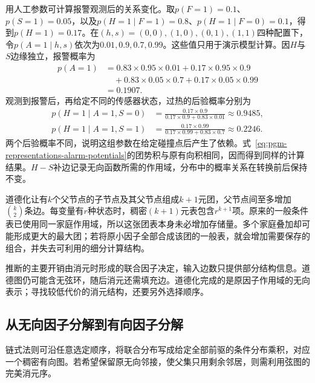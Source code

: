 用人工参数可计算报警观测后的关系变化。取$p(F=1)=0.1$、$p(S=1)=0.05$，以及$p(H=1\mid F=1)=0.8$、$p(H=1\mid F=0)=0.1$，得到$p(H=1)=0.17$。在$(h,s)=(0,0),(1,0),(0,1),(1,1)$四种配置下，令$p(A=1\mid h,s)$依次为$0.01,0.9,0.7,0.99$。这些值只用于演示模型计算。因$H$与$S$边缘独立，报警概率为
\[
  \begin{aligned}
    p(A=1)
    &=0.83\times0.95\times0.01
      +0.17\times0.95\times0.9\\
    &\quad+0.83\times0.05\times0.7
      +0.17\times0.05\times0.99\\
    &=0.1907.
  \end{aligned}
\]
观测到报警后，再给定不同的传感器状态，过热的后验概率分别为
\begin{equation}
  \begin{aligned}
    p(H=1\mid A=1,S=0)
    &=\frac{0.17\times0.9}
    {0.17\times0.9+0.83\times0.01}
    \approx0.9485,\\
    p(H=1\mid A=1,S=1)
    &=\frac{0.17\times0.99}
    {0.17\times0.99+0.83\times0.7}
    \approx0.2246.
  \end{aligned}
  \label{eq:pgm-representations-alarm-posteriors}
\end{equation}
两个后验概率不同，说明这组参数在给定碰撞点后产生了依赖。式~\eqref{eq:pgm-representations-alarm-potentials}的团势积与原有向积相同，因而得到同样的计算结果。$H-S$补边记录无向函数所需的作用域，分布中的概率关系在转换前后保持不变。

道德化让有$k$个父节点的子节点及其父节点组成$k+1$元团，父节点间至多增加$\binom{k}{2}$条边。每变量有$r$种状态时，稠密$(k+1)$元表包含$r^{k+1}$项。原来的一般条件表已使用同一家庭作用域，所以这张团表本身未必增加存储量。多个家庭叠加却可能形成更大的最大团；若将原小因子全部合成该团的一般表，就会增加需要保存的组合，并失去可利用的细分计算结构。

推断的主要开销由消元时形成的联合因子决定，输入边数只提供部分结构信息。道德图仍可能含无弦环，随后消元还需填充边。道德化完成的是原因子作用域的无向表示；寻找较低代价的消元结构，还要另外选择顺序。

\subsection{从无向因子分解到有向因子分解}
\label{sec:pgm-representations-undirected-to-directed}

链式法则可沿任意选定顺序，将联合分布写成给定全部前驱的条件分布乘积，对应一个稠密有向图。若希望保留原无向邻接，使父集只用剩余邻居，则需利用弦图的完美消元序。

